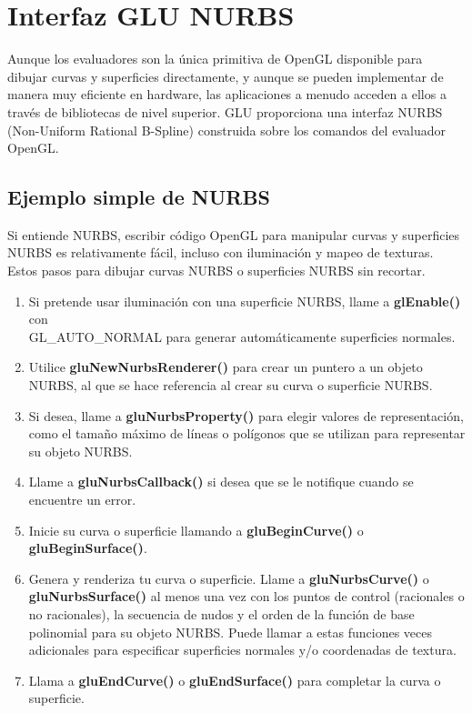 \section{Interfaz GLU NURBS}

Aunque los evaluadores son la única primitiva de OpenGL
disponible para dibujar curvas y superficies directamente,
y aunque se pueden implementar de manera muy eficiente en hardware,
las aplicaciones a menudo acceden a ellos a través
de bibliotecas de nivel superior.
GLU proporciona una interfaz NURBS (Non-Uniform Rational B-Spline)
construida sobre los comandos del evaluador OpenGL.

\subsection{Ejemplo simple de NURBS}

Si entiende NURBS, escribir código OpenGL para
manipular curvas y superficies NURBS es relativamente
fácil, incluso con iluminación y mapeo de texturas.
Estos pasos para dibujar curvas NURBS o superficies NURBS sin recortar.

\begin{enumerate}
    \item Si pretende usar iluminación con una superficie NURBS, llame
    a \textbf{glEnable()} con \\ GL\_AUTO\_NORMAL para generar
    automáticamente superficies normales.
    \item Utilice \textbf{gluNewNurbsRenderer()} para crear un puntero
    a un objeto NURBS, al que se hace referencia al crear su curva o
    superficie NURBS.
    \item Si desea, llame a \textbf{gluNurbsProperty()} para elegir
    valores de representación, como el tamaño máximo de líneas o polígonos
    que se utilizan para representar su objeto NURBS.
    \item Llame a \textbf{gluNurbsCallback()} si desea que se le notifique
    cuando se encuentre un error.
    \item Inicie su curva o superficie llamando a \textbf{gluBeginCurve()}
    o \textbf{gluBeginSurface()}.
    \item Genera y renderiza tu curva o superficie. Llame a
    \textbf{gluNurbsCurve()} o \textbf{gluNurbsSurface()} al menos una
    vez con los puntos de control (racionales o no racionales),
    la secuencia de nudos y el orden de la función de base polinomial
    para su objeto NURBS. Puede llamar a estas funciones veces
    adicionales para especificar superficies normales y/o coordenadas de textura.
    \item Llama a \textbf{gluEndCurve()} o \textbf{gluEndSurface()}
    para completar la curva o superficie.
\end{enumerate}


